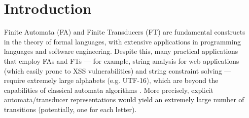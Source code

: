 \section{Introduction}
\label{sec:introduction}

Finite Automata (FA) and Finite Transducers (FT) are fundamental constructs in the theory of formal languages, with extensive applications in programming 
languages and software engineering. Despite this, many practical applications
that employ FAs and FTs --- for example, string analysis for web applications
(which easily prone to XSS vulnerabilities) and string constraint solving
--- require extremely large alphabets (e.g. UTF-16), which are beyond the
capabilities of classical automata algorithms
\cite{DV21,cav/DAntoniV17,uss/HooimeijerLMSV11,Berkeley-JavaScript}.
More precisely, explicit automata/transducer representations would yield 
an extremely large number of transitions (potentially, one for 
each letter).







